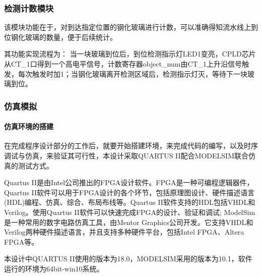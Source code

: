   
    \subsubsection{检测计数模块}
    
    该模块功能在于，对到达指定位置的钢化玻璃进行计数，可以准确得知流水线上到位钢化玻璃的数量，便于后续统计。\par
    其功能实现流程为：
    当一块玻璃到位后，到位检测指示灯LED1变亮，CPLD芯片从CT\_1口得到一个高电平信号，计数寄存器object\_num由CT\_1上升沿信号触发，每次触发时加1；当钢化玻璃离开检测区域后，检测指示灯灭，等待下一块玻璃到位。\par
    \subsubsection{仿真模拟}
    \paragraph{仿真环境的搭建}
    在完成程序设计部分的工作后，就要开始搭建环境，来完成代码的编写，以及时序调试与仿真，来验证其可行性，本设计采取QUARTUS II配合MODELSIM联合仿真的测试方式。\par
    Quartus II是由Intel公司推出的FPGA设计软件。FPGA是一种可编程逻辑器件，Quartus II软件可以用于FPGA设计的各个环节，包括原理图设计、硬件描述语言(HDL)编程、仿真、综合、布局布线等。Quartus II软件支持的HDL包括VHDL和Verilog。使用Quartus II软件可以快速完成FPGA的设计、验证和调试;
    ModelSim是一种常用的数字电路仿真工具，由Mentor Graphics公司开发。它支持VHDL和Verilog两种硬件描述语言，并且支持多种硬件平台，包括Intel FPGA、Altera FPGA等。\par
    本设计中QUARTUS II使用的版本为18.0，MODELSIM采用的版本为10.1，软件运行的环境为64bit-win10系统。\par
